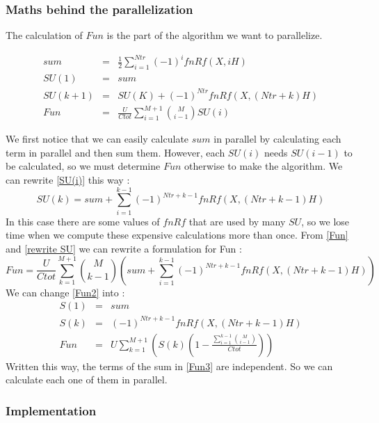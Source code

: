\documentclass[11pt,a4paper]{article}
\begin{document}
\subsubsection*{Maths behind the parallelization}

The calculation of $Fun$ is the part of the algorithm we want to parallelize.

\begin{eqnarray}
	sum &=& \frac{1}{2}   \sum_{i=1}^{Ntr} (-1)^{i}fnRf(X,iH)\\
	SU(1) &=& sum  \\
	SU(k + 1) &=& SU(K) + (-1)^{Ntr}fnRf(X,(Ntr + k)H) \label{SU(i)}\\
	Fun &=&\frac{U}{Ctot} \sum_{i=1}^{M+1} \binom{M}{i-1}SU(i) \label{Fun}
\end{eqnarray}

We first notice that we can easily calculate $sum$ in parallel by calculating each term in parallel and then sum them. However, each $SU(i)$ needs $SU(i-1)$ to be calculated, so we must determine $Fun$ otherwise to make the algorithm.
We can rewrite \eqref{SU(i)} this way :
\begin{equation}
	SU(k) = sum + \sum_{i=1}^{k-1} (-1)^{Ntr+k-1}fnRf(X,(Ntr + k-1)H)
	\label{rewrite SU}
\end{equation}
In this case there are some values of $fnRf$ that are used by many $SU$, so we lose time when we compute these expensive calculations more than once.
From \eqref{Fun} and \eqref{rewrite SU} we can rewrite a formulation for Fun :
\begin{equation}
	Fun =\displaystyle{ \frac{U}{Ctot}  \sum_{k=1}^{M+1} \binom{M}{k-1}\left(sum + \sum_{i=1}^{k-1} (-1)^{Ntr+k-1}fnRf(X,(Ntr + k-1)H)\right)}
	\label{Fun2}
\end{equation}
We can change \eqref{Fun2} into :
\begin{eqnarray}
	S(1) &=& sum\\
	S(k) &=& (-1)^{Ntr+k-1}fnRf(X,(Ntr + k-1)H)\\
	Fun &=& \displaystyle{U \sum_{k=1}^{M+1}\left(S(k)(1-\frac{ \sum_{i=1}^{k-1} \binom{M}{i-1}}{Ctot})\right)} \label{Fun3}
\end{eqnarray}
Written this way, the terms of the sum in \eqref{Fun3} are independent. So we can calculate each one of them in parallel.

\subsubsection*{Implementation}
\end{document}
